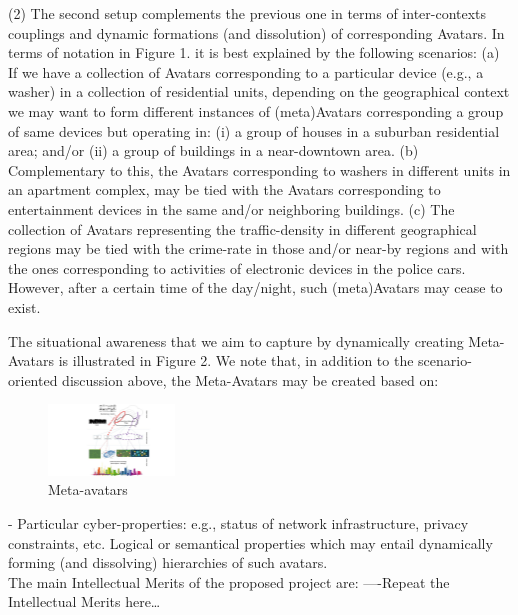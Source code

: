 (2) The second setup complements the previous one in terms of inter-contexts couplings and dynamic formations (and dissolution) of corresponding Avatars. In terms of notation in Figure 1. it is best explained by the following scenarios:
(a) If we have a collection of Avatars corresponding to a particular device (e.g., a washer) in a collection of residential units, depending on the geographical context we may want to form different instances of (meta)Avatars corresponding a group of same devices but operating in: (i) a group of houses in a suburban residential area; and/or (ii) a group of buildings in a near-downtown area.
(b) Complementary to this, the Avatars corresponding to washers in different units in an apartment complex, may be tied with the Avatars corresponding to entertainment devices in the same and/or neighboring buildings.
(c) The collection of Avatars representing the traffic-density in different geographical regions may be tied with the crime-rate in those and/or near-by regions and with the ones corresponding to activities of electronic devices in the police cars. However, after a certain time of the day/night, such (meta)Avatars may cease to exist. 

The situational awareness that we aim to capture by dynamically creating Meta-Avatars is illustrated in Figure 2. We note that, in addition to the scenario-oriented discussion above, the Meta-Avatars may be created based on:\\

\begin{figure} \vspace{-3mm}
	\centerline{\includegraphics[width=0.30\textwidth]{./fig2.jpg}}
	\vspace{-3mm} \caption{\small Meta-avatars}
	\label{fig1}
	\vspace{-3mm}
\end{figure}

-	Particular cyber-properties: e.g., status of network infrastructure, privacy constraints, etc.
Logical or semantical properties which may entail dynamically forming (and dissolving) hierarchies of such avatars.\\

The main Intellectual Merits of the proposed project are:
----Repeat the Intellectual Merits here…
